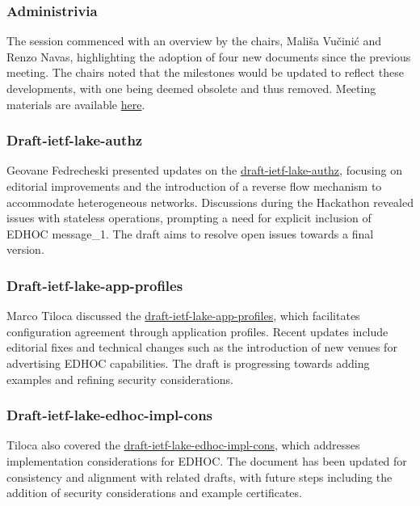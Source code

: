 \documentclass{article}
\begin{document}
\subsubsection{Administrivia}

The session commenced with an overview by the chairs, Mališa Vučinić and Renzo Navas, highlighting the adoption of four new documents since the previous meeting. The chairs noted that the milestones would be updated to reflect these developments, with one being deemed obsolete and thus removed. Meeting materials are available \href{https://datatracker.ietf.org/meeting/122/materials/slides-122-lake-chairs-slides-00}{here}.

\subsubsection{Draft-ietf-lake-authz}

Geovane Fedrecheski presented updates on the \href{https://datatracker.ietf.org/doc/html/draft-ietf-lake-authz}{draft-ietf-lake-authz}, focusing on editorial improvements and the introduction of a reverse flow mechanism to accommodate heterogeneous networks. Discussions during the Hackathon revealed issues with stateless operations, prompting a need for explicit inclusion of EDHOC message\_1. The draft aims to resolve open issues towards a final version.

\subsubsection{Draft-ietf-lake-app-profiles}

Marco Tiloca discussed the \href{https://datatracker.ietf.org/doc/html/draft-ietf-lake-app-profiles}{draft-ietf-lake-app-profiles}, which facilitates configuration agreement through application profiles. Recent updates include editorial fixes and technical changes such as the introduction of new venues for advertising EDHOC capabilities. The draft is progressing towards adding examples and refining security considerations.

\subsubsection{Draft-ietf-lake-edhoc-impl-cons}

Tiloca also covered the \href{https://datatracker.ietf.org/doc/html/draft-ietf-lake-edhoc-impl-cons}{draft-ietf-lake-edhoc-impl-cons}, which addresses implementation considerations for EDHOC. The document has been updated for consistency and alignment with related drafts, with future steps including the addition of security considerations and example certificates.
\end{document}
